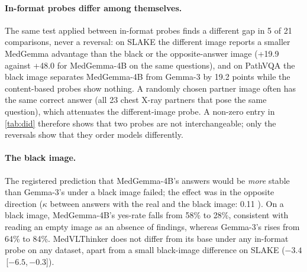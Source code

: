 \documentclass[10pt,twocolumn,letterpaper]{article}
\newcommand{\ci}[2]{\,[#1,\,#2]}  %
\begin{document}
\paragraph{In-format probes differ among themselves.} The same test applied between in-format probes finds a
different gap in 5 of 21 comparisons, never a reversal: on SLAKE the different image reports a smaller MedGemma
advantage than the black or the opposite-answer image (\eg +19.9 against +48.0 for MedGemma-4B on the same
questions), and on PathVQA the black image separates MedGemma-4B from Gemma-3 by 19.2 points while the
content-based probes show nothing. A randomly chosen partner image often has the same correct answer (all 23 chest
X-ray partners that pose the same question), which attenuates the different-image probe. A non-zero entry in
\cref{tab:did} therefore shows that two probes are not interchangeable; only the reversals show that they order
models differently.

\paragraph{The black image.} The registered prediction that MedGemma-4B's answers would be \emph{more} stable than
Gemma-3's under a black image failed; the effect was in the opposite direction ($\kappa$ between answers with the
real and the black image: 0.11 ). On a black image, MedGemma-4B's yes-rate falls from 58\% to 28\%,
consistent with reading an empty image as an absence of findings, whereas Gemma-3's rises from 64\% to 84\%.
MedVLThinker does not differ from its base under any in-format probe on any dataset, apart from a small
black-image difference on SLAKE ($-3.4$\ci{$-6.5$}{$-0.3$}).
\end{document}

